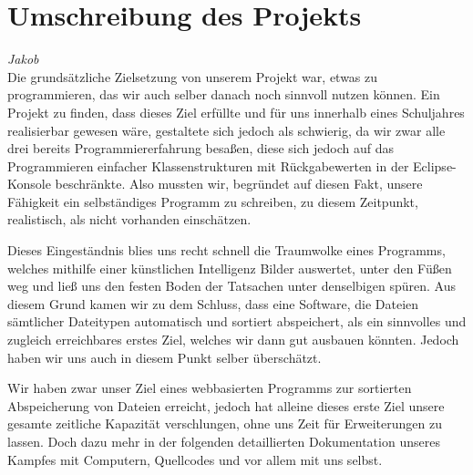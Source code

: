 \documentclass[12pt,a4paper,bibliography=totocnumbered,listof=totocnumbered]{scrartcl}
\begin{document}
\section{Umschreibung des Projekts}
\emph{Jakob}
\\
Die grundsätzliche Zielsetzung von unserem Projekt war, etwas zu programmieren, das
wir auch selber danach noch sinnvoll nutzen können.
Ein Projekt zu finden, dass dieses Ziel erfüllte und für uns innerhalb eines Schuljahres realisierbar gewesen wäre, gestaltete sich jedoch als schwierig, da wir zwar alle drei bereits Programmiererfahrung besaßen, diese sich jedoch auf das Programmieren einfacher Klassenstrukturen mit Rückgabewerten in der Eclipse-Konsole
beschränkte.
Also mussten wir, begründet auf diesen Fakt, unsere Fähigkeit ein selbständiges Programm zu schreiben, zu diesem Zeitpunkt, realistisch, als nicht vorhanden einschätzen.

Dieses Eingeständnis blies uns recht schnell die Traumwolke eines Programms, welches mithilfe einer künstlichen Intelligenz Bilder auswertet, unter den Füßen weg und ließ uns den festen Boden der Tatsachen unter denselbigen spüren.
Aus diesem Grund kamen wir zu dem Schluss, dass eine Software, die Dateien sämtlicher Dateitypen automatisch und sortiert abspeichert, als ein sinnvolles und zugleich erreichbares erstes Ziel, welches wir dann gut ausbauen könnten.
Jedoch haben wir uns auch in diesem Punkt selber überschätzt.

Wir haben zwar unser Ziel eines webbasierten Programms zur sortierten Abspeicherung von Dateien erreicht, jedoch hat alleine dieses \glqq erste Ziel\grqq{} unsere gesamte zeitliche Kapazität verschlungen, ohne uns Zeit für Erweiterungen zu lassen.
Doch dazu mehr in der folgenden detaillierten Dokumentation unseres Kampfes mit Computern, Quellcodes und vor allem mit uns selbst.

\vspace{-1,2em}

\pagebreak

\renewcommand{\cfttabpresnum}{Tab. }
\renewcommand{\cftfigpresnum}{Abb. }
\settowidth{\cfttabnumwidth}{Abb. 10\quad}
\settowidth{\cftfignumwidth}{Abb. 10\quad}
\end{document}
